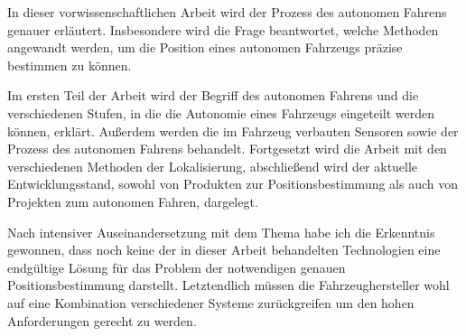 
In dieser vorwissenschaftlichen Arbeit wird der Prozess des autonomen Fahrens genauer erläutert. Insbesondere wird die Frage beantwortet, welche Methoden angewandt werden, um die Position eines autonomen Fahrzeugs präzise bestimmen zu können.
\bigskip

Im ersten Teil der Arbeit wird der Begriff des autonomen Fahrens und die verschiedenen Stufen, in die die Autonomie eines Fahrzeugs eingeteilt werden können, erklärt. Außerdem werden die im Fahrzeug verbauten Sensoren sowie der Prozess des autonomen Fahrens behandelt. Fortgesetzt wird die Arbeit mit den verschiedenen Methoden der Lokalisierung, abschließend wird der aktuelle Entwicklungsstand, sowohl von Produkten zur Positionsbestimmung als auch von Projekten zum autonomen Fahren, dargelegt.
\bigskip

Nach intensiver Auseinandersetzung mit dem Thema habe ich die Erkenntnis gewonnen, dass noch keine der in dieser Arbeit behandelten Technologien eine endgültige Lösung für das Problem der notwendigen genauen Positionsbestimmung darstellt. Letztendlich müssen die Fahrzeughersteller wohl auf eine Kombination verschiedener Systeme zurückgreifen um den hohen Anforderungen gerecht zu werden.
